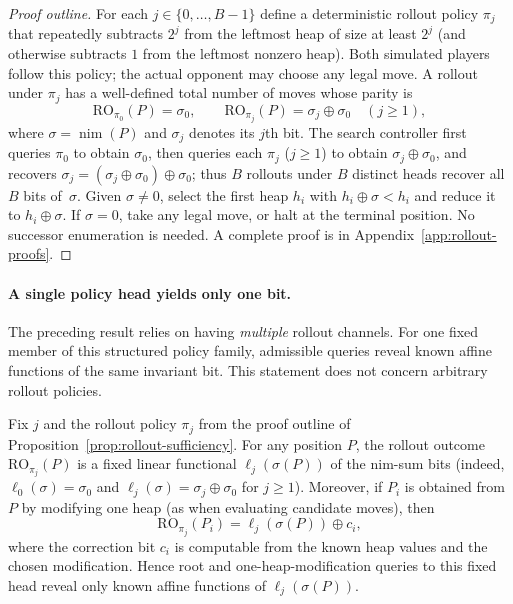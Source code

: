 \documentclass[twoside,11pt]{article}
\numberwithin{theorem}{section}
\numberwithin{equation}{section}
\begin{document}
\begin{proof}[Proof outline]
For each $j\in\{0,\dots,B-1\}$ define a deterministic rollout policy $\pi_j$ that repeatedly subtracts $2^j$ from the leftmost heap of size at least $2^j$ (and otherwise subtracts $1$ from the leftmost nonzero heap). Both simulated players follow this policy; the actual opponent may choose any legal move.
A rollout under $\pi_j$ has a well-defined total number of moves whose parity is
\[
\mathrm{RO}_{\pi_0}(P)=\sigma_0,\qquad
\mathrm{RO}_{\pi_j}(P)=\sigma_j\oplus\sigma_0\quad(j\ge 1),
\]
where $\sigma=\operatorname{nim}(P)$ and $\sigma_j$ denotes its $j$th bit.
The search controller first queries $\pi_0$ to obtain $\sigma_0$, then queries each $\pi_j$ ($j\ge 1$) to obtain $\sigma_j\oplus\sigma_0$, and recovers $\sigma_j = (\sigma_j\oplus\sigma_0)\oplus\sigma_0$; thus $B$ rollouts under $B$ distinct heads recover all $B$ bits of~$\sigma$.
Given $\sigma\ne0$, select the first heap $h_i$ with $h_i\oplus\sigma<h_i$ and reduce it to $h_i\oplus\sigma$. If $\sigma=0$, take any legal move, or halt at the terminal position. No successor enumeration is needed.
A complete proof is in Appendix~\ref{app:rollout-proofs}.
\end{proof}

\paragraph{A single policy head yields only one bit.}
The preceding result relies on having \emph{multiple} rollout channels.
For one fixed member of this structured policy family, admissible queries reveal known affine functions of the same invariant bit. This statement does not concern arbitrary rollout policies.

\begin{proposition}
\label{prop:single-policy-bound}
Fix $j$ and the rollout policy $\pi_j$ from the proof outline of Proposition~\ref{prop:rollout-sufficiency}.
For any position $P$, the rollout outcome $\mathrm{RO}_{\pi_j}(P)$ is a fixed linear functional $\ell_j(\sigma(P))$ of the nim-sum bits (indeed, $\ell_0(\sigma)=\sigma_0$ and $\ell_j(\sigma)=\sigma_j\oplus\sigma_0$ for $j\ge 1$).
Moreover, if $P_i$ is obtained from $P$ by modifying one heap (as when evaluating candidate moves), then
\[
\mathrm{RO}_{\pi_j}(P_i)=\ell_j(\sigma(P))\oplus c_i,
\]
where the correction bit $c_i$ is computable from the known heap values and the chosen modification.
Hence root and one-heap-modification queries to this fixed head reveal only known affine functions of $\ell_j(\sigma(P))$.
\end{proposition}
\end{document}
